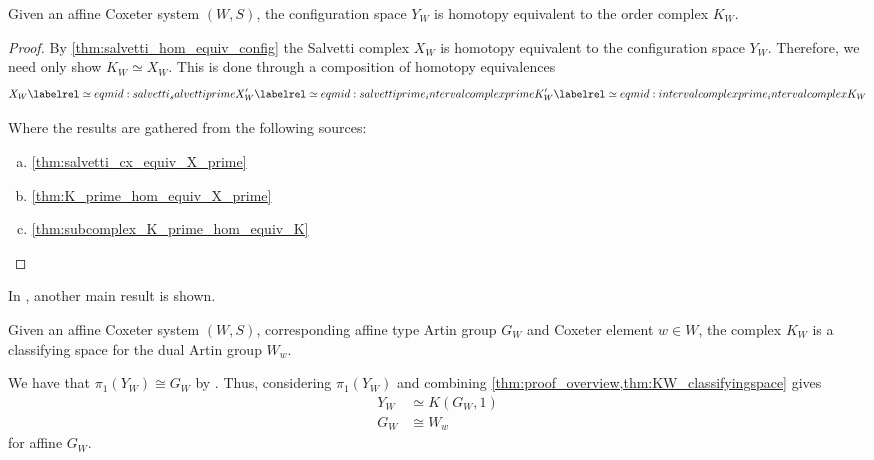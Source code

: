 \begin{theorem}
	Given an affine Coxeter system $(W,S)$, the configuration space $Y_W$ is homotopy equivalent to the order complex $K_W$.
	\label{thm:proof_overview}
\end{theorem}
\begin{proof}
	By \cref{thm:salvetti_hom_equiv_config} the Salvetti complex $X_W$ is homotopy equivalent to the configuration space $Y_W$. Therefore, we need only show $K_W \simeq X_W$. This is done through a composition of homotopy equivalences
	\begin{equation}
		X_W \labelrel\simeq{eqmid:salvetti_salvettiprime}
		X^\prime_W \labelrel\simeq{eqmid:salvettiprime_intervalcomplexprime}
		K^\prime_W \labelrel\simeq{eqmid:intervalcomplexprime_intervalcomplex}
		K_W
		\label{eqn:proof_overview}
	\end{equation}

	Where the results are gathered from the following sources:

	\begin{enumerate}[(a)]
		\item \cref{thm:salvetti_cx_equiv_X_prime} \cite[Theorem 5.5]{paolini_salvetti_kpi1_2021}
		\item \cref{thm:K_prime_hom_equiv_X_prime} \cite[Theorem 8.14]{paolini_salvetti_kpi1_2021}
		\item \cref{thm:subcomplex_K_prime_hom_equiv_K} \cite[Theorem 7.9]{paolini_salvetti_kpi1_2021}
	\end{enumerate}
	\vspace{-3em}
\end{proof}
\vspace{1.5em}

In \cite{paolini_salvetti_kpi1_2021}, another main result is shown.

\begin{theorem}
	Given an affine Coxeter system $(W,S)$, corresponding affine type Artin group $G_W$ and Coxeter element $w\in W$, the complex $K_W$ is a classifying space for the dual Artin group $W_w$.
	\label{thm:KW_classifyingspace}
\end{theorem}

We have that $\pi_1(Y_W) \cong G_W$ by \cite{brieskorn_fundamentalgruppe_1971}. Thus, considering $\pi_1(Y_W)$ and combining \cref{thm:proof_overview,thm:KW_classifyingspace} gives
\begin{align*}
	Y_W & \simeq K(G_W,1) \\
	G_W & \cong W_w
	\label{eq:artin_iso_dual}
\end{align*}
for affine $G_W$.

